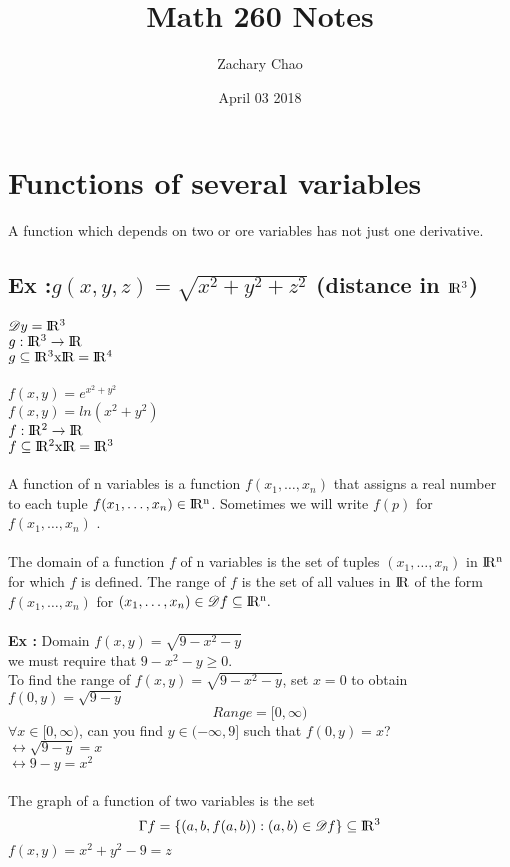 \documentclass[12pt, letterpaper, twoside]{article}
\title{Math 260 Notes}
\author{Zachary Chao}
\date{April 03 2018}
\newcommand{\real}{\rm I\!R}
\newcommand{\domain}{\mathscr{D}}
\begin{document}
\maketitle

\section*{Functions of several variables}
A function which depends on two or ore variables has not just one derivative.
\subsection*{Ex :$g(x,y,z) = \sqrt{x^2+y^2+z^2}$ (distance in $\real^3$)}
$\domain y = \real^3$\\
$g : \real^3 \to \real$\\
$g \subseteq \real^3 x \real = \real^4$\\
\\
$f(x,y) = e^{x^2+y^2}$\\
$f(x,y) = ln(x^2+y^2)$\\
$f : \real^2 \to \real$\\
$f \subseteq \real^2 x \real = \real^3$\\
\\
A function of n variables is a function $f(x_1, \dots, x_n)$ that assigns a real number 
to each tuple $f(x_1, \dots, x_n) \in \real^n$. Sometimes we will write $f(p)$ for $f(x_1, \dots, x_n)$ .\\
\\
The domain of a function $f$ of n variables is the set of tuples  $(x_1, \dots, x_n)$  in $\real^n$ for which 
$f$ is defined. The range of $f$ is the set of all values in $\real$ of the form  $f(x_1, \dots, x_n)$ for
$(x_1, \dots, x_n) \in \domain f \subseteq \real^n.$\\
\\
\textbf{Ex : } Domain $f(x,y) = \sqrt{9-x^2-y}$\\
we must require that $9-x^2-y \geq 0$.\\
To find the range of $f(x,y) = \sqrt{9-x^2-y}$, set $x=0$ to obtain $f(0,y) = \sqrt{9-y}$
$$Range = [0, \infty)$$ 
$\forall x \in [0,\infty)$, can you find $y \in (-\infty, 9]$ such that $f(0,y)=x$?\\
$\leftrightarrow \sqrt{9-y} = x$\\
$\leftrightarrow 9-y = x^2$\\
\\
The graph of a function of two variables is the set 
$$\Gamma f = \{(a,b,f(a,b)) : (a,b) \in \domain f\} \subseteq \real^3$$
$f(x,y) = x^2+y^2-9=z$
\\
\end{document}
